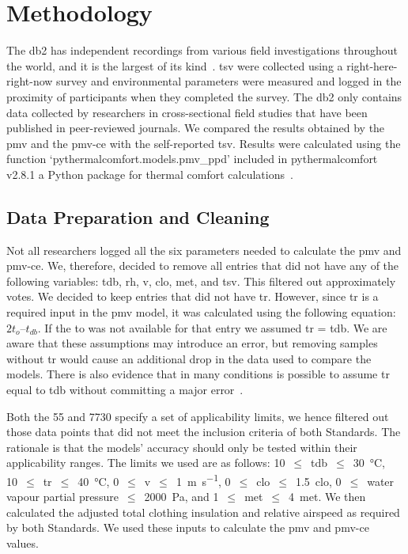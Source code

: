 \section{Methodology}\label{sec:methodology}
The \ac{db2} has  independent recordings from various field investigations throughout the world, and it is the largest of its kind~\cite{FoldvaryLicina2018, db2dryad}.
\Ac{tsv} were collected using a right-here-right-now survey and environmental parameters were measured and logged in the proximity of participants when they completed the survey.
The \ac{db2} only contains data collected by researchers in cross-sectional field studies that have been published in peer-reviewed journals.
 We compared the results obtained by the \ac{pmv} and the \ac{pmv-ce} with the self-reported \ac{tsv}.
Results were calculated using the function `pythermalcomfort.models.pmv\_ppd' included in pythermalcomfort v2.8.1 a Python package for thermal comfort calculations~\cite{Tartarini2020a}.

\subsection{Data Preparation and Cleaning}\label{subsec:data-processing-and-cleaning}
Not all researchers logged all the six parameters needed to calculate the \ac{pmv} and \ac{pmv-ce}.
We, therefore, decided to remove all entries that did not have any of the following variables: \ac{tdb}, \ac{rh}, \ac{v}, \ac{clo}, \ac{met}, and \ac{tsv}.
This filtered out approximately  votes.
We decided to keep entries that did not have \ac{tr}.
However, since \ac{tr} is a required input in the \ac{pmv} model, it was calculated using the following equation: $2 t_{o} – t_{db}$.
If the \ac{to} was not available for that entry we assumed \ac{tr} = \ac{tdb}.
We are aware that these assumptions may introduce an error, but removing samples without \ac{tr} would cause an additional  drop in the data used to compare the models.
There is also evidence that in many conditions is possible to assume \ac{tr} equal to \ac{tdb} without committing a major error~\cite{Dawe2020}.

Both the \gls{55} and \gls{7730} specify a set of applicability limits, we hence filtered out those data points that did not meet the inclusion criteria of both Standards.
The rationale is that the models' accuracy should only be tested within their applicability ranges.
The limits we used are as follows:
\num{10}~$\leq$~\ac{tdb}~$\leq$~\qty{30}{\celsius},
\num{10}~$\leq$~\ac{tr}~$\leq$~\qty{40}{\celsius},
\num{0}~$\leq$~\ac{v}~$\leq$~\qty{1}{\m\per\s},
\num{0}~$\leq$~\ac{clo}~$\leq$~\qty{1.5}{clo},
\num{0}~$\leq$~water vapour partial pressure~$\leq$~\qty{2000}{\pascal},
and \num{1}~$\leq$~\ac{met}~$\leq$~\qty{4}{met}.
We then calculated the adjusted total clothing insulation and relative airspeed as required by both Standards.
We used these inputs to calculate the \ac{pmv} and \ac{pmv-ce} values.

